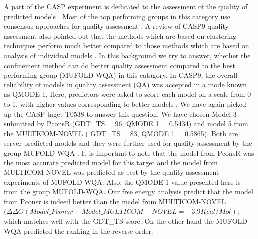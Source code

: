 \documentclass[12pt]{article}
\begin{document}
A part of the CASP experiment is dedicated to the assessment of the quality of predicted models
\cite{Kryshtafovych2011}. Most of the top performing groups in this category use consensus
approaches for quality assessment \cite{Wang2011}. A review of CASP9 quality assessment also pointed
out that the methods which are based on clustering techniques perform much better compared to those
methods which are based on analysis of individual models \cite{Kryshtafovych2011}. In this
background we try to answer, whether the confinement method can do better quality assessment
compared to the best performing group (MUFOLD-WQA) in this catagory. In CASP9, the overall
reliability of models in quality assessment (QA) was accepted in a mode known as QMODE 1. Here,
predictors were asked to score each model on a scale from 0 to 1, with higher values corresponding
to better models \cite{Kryshtafovych2011}. We have again picked up the CASP taget T0538 to answer
this question. We have chosen Model 3 submitted by PconsR (GDT\_TS = 96, QMODE 1 = 0.5434) and model
5 from the MULTICOM-NOVEL ( GDT\_TS = 83, QMODE 1 = 0.5865). Both are server predicted models and
they were further used for quality assessment by the group MUFOLD-WQA \cite{Wang2011}. It is
important to note that the model from PconsR was the most accurate predicted model for this target
and the model from MULTICOM-NOVEL was predicted as best by the quality assessment experiments of
MUFOLD-WQA. Also, the QMODE 1 value presented here is from the group MUFOLD-WQA. Our free energy
analysis predict that the model from Pconsr is indeed better than the model from MULTICOM-NOVEL
$(\Delta \Delta G (Model\_Pconsr - Model\_MULTICOM-NOVEL = -3.9 Kcal/Mol)$, which   matches well
with the GDT\_TS score. On the other hand the MUFOLD-WQA predicted the ranking in the reverse order. 
\end{document}
